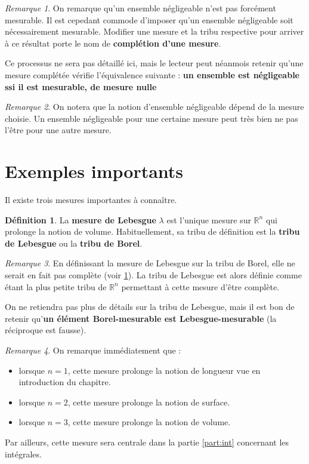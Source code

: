 \documentclass[french]{report}
\theoremstyle{plain}
\theoremstyle{definition}
\newtheorem{defi}{Définition}[section]
\theoremstyle{remark}
\newtheorem{rem}{Remarque}[section]
\newcommand\itemb{\item[$\bullet$]}
\begin{document}
\begin{rem}
  \label{rem:completion}
  On remarque qu'un ensemble négligeable n'est pas forcément mesurable.
  Il est cepedant commode d'imposer qu'un ensemble négligeable soit nécessairement mesurable.
  Modifier une mesure et la tribu respective pour arriver à ce résultat porte le nom de \textbf{complétion d'une mesure}.

  Ce processus ne sera pas détaillé ici, mais le lecteur peut néanmois retenir qu'une mesure complétée vérifie l'équivalence suivante : \textbf{un ensemble est négligeable ssi il est mesurable, de mesure nulle}
\end{rem}

\begin{rem}
  On notera que la notion d'ensemble négligeable dépend de la mesure choisie.
  Un ensemble négligeable pour une certaine mesure peut très bien ne pas l'être pour une autre mesure.
\end{rem}

\section{Exemples importants}
Il existe trois mesures importantes à connaître.

\begin{defi}
  La \textbf{mesure de Lebesgue} $\lambda$ est l'unique mesure sur $\mathbb{R}^n$ qui prolonge la notion de volume.
  Habituellement, sa tribu de définition est la \textbf{tribu de Lebesgue} ou la \textbf{tribu de Borel}.
\end{defi}

\begin{rem}
  En définissant la mesure de Lebesgue sur la tribu de Borel, elle ne serait en fait pas complète (voir \ref{rem:completion}).
  La tribu de Lebesgue est alors définie comme étant la plus petite tribu de $\mathbb{R}^n$ permettant à cette mesure d'être complète.
  
  On ne retiendra pas plus de détails sur la tribu de Lebesgue, mais il est bon de retenir qu'\textbf{un élément Borel-mesurable est Lebesgue-mesurable} (la réciproque est fausse).
\end{rem}

\begin{rem}
  On remarque immédiatement que :
  \begin{itemize}
    \itemb lorsque $n=1$, cette mesure prolonge la notion de longueur vue en introduction du chapitre.
    \itemb lorsque $n=2$, cette mesure prolonge la notion de surface.
    \itemb lorsque $n=3$, cette mesure prolonge la notion de volume.
  \end{itemize}

  Par ailleurs, cette mesure sera centrale dans la partie \ref{part:int} concernant les intégrales.
\end{rem}
\end{document}
